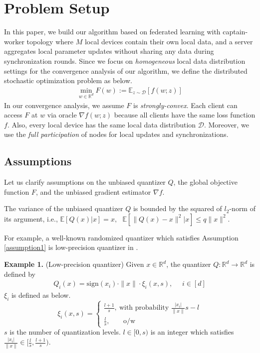 \section{Problem Setup} \label{problem_setup}

In this paper, we build our algorithm based on federated learning with captain-worker topology where $M$ local devices contain their own local data, and a server aggregates local parameter updates without sharing any data during synchronization rounds. Since we focus on \emph{homogeneous} local data distribution settings for the convergence analysis of our algorithm, we define the distributed stochastic optimization problem as below.
\begin{align*}
    \min_{w \in \mathbb{R}^d} F(w) := \mathbb{E}_{z\sim\mathcal{D}}[f(w;z)]
\end{align*}
In our convergence analysis, we assume $F$ is \emph{strongly-convex}. Each client can access $F$ at $w$ via oracle $\nabla f(w;z)$ because all clients have the same loss function $f$. Also, every local device has the same local data distribution $\mathcal{D}$. Moreover, we use the \emph{full participation} of nodes for local updates and synchronizations. 

\subsection{Assumptions}

Let us clarify assumptions on the unbiased quantizer $Q$, the global objective function $F$, and the unbiased gradient estimator $\nabla f$.

\begin{assumption} \label{assumption1}
The variance of the unbiased quantizer $Q$ is bounded by the squared of $l_2$-norm of its argument, i.e., $\mathbb{E}[Q(x)|x]=x, \textrm{ } \mathbb{E}[\|Q(x) - x\|^2 |x] \leq q \|x\|^2$.
\end{assumption}
For example, a well-known randomized quantizer which satisfies Assumption \ref{assumption1} is low-precision quantizer in \citet{alistarh2017qsgd}.

\textbf{Example 1.} (Low-precision quantizer) Given $x \in \mathbb{R}^d$, the quantizer $Q:\mathbb{R}^d \rightarrow \mathbb{R}^d$ is defined by
\begin{align*}
    Q_i(x) = \textrm{sign}(x_i)\cdot\|x\|\cdot \xi_i(x, s),   \textrm{ } \textrm{ } i \in [d]
\end{align*}
$\xi_i$ is defined as below.
$$\xi_i(x, s)=
\begin{cases}
\frac{l+1}{s},~\textrm{with probability } \frac{|x_i|}{\|x\|}s - l\\
\frac{l}{s},~\textrm{ } \textrm{ } \textrm{ o/w}
\end{cases}$$
$s$ is the number of quantization levels. $l \in [0, s)$ is an integer which satisfies $\frac{|x_i|}{\|x\|} \in [\frac{l}{s}, \frac{l+1}{s})$.

